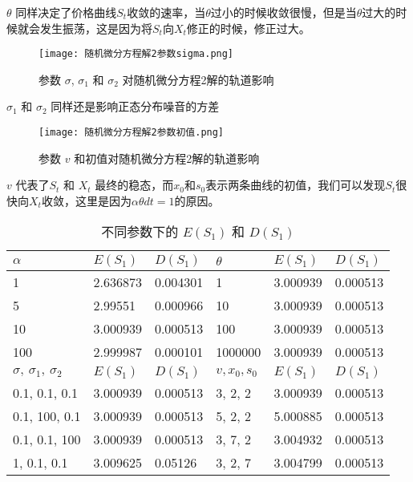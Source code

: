 \documentclass{article}
\begin{document}
$\theta$ 同样决定了价格曲线$S_t$收敛的速率，当$\theta$过小的时候收敛很慢，但是当$\theta$过大的时候就会发生振荡，这是因为将$S_t$向$X_t$修正的时候，修正过大。


\begin{figure}[H]
    \centering
    \texttt{[image: 随机微分方程解2参数sigma.png]}
    \caption{参数 $\sigma$, $\sigma_1$ 和 $\sigma_2$ 对随机微分方程2解的轨道影响}
    \label{fig:SDE2_sigma}
    \end{figure}    


$\sigma_1$ 和 $\sigma_2$ 同样还是影响正态分布噪音的方差


\begin{figure}[H]
    \centering
    \texttt{[image: 随机微分方程解2参数初值.png]}
    \caption{参数 $v$ 和初值对随机微分方程2解的轨道影响}
    \label{fig:SDE2_x0}
    \end{figure}

$v$ 代表了$S_t$ 和 $X_t$ 最终的稳态，而$x_0$和$s_0$表示两条曲线的初值，我们可以发现$S_t$很快向$X_t$收敛，这里是因为$\alpha\theta dt = 1$的原因。


\begin{table}[H]
    \centering
    \caption{不同参数下的 $E(S_1)$ 和 $D(S_1)$}
    \begin{tabular}{l|l|l|l|l|l}
    \hline
    $\alpha$                           & $E(S_1)$  & $D(S_1)$  & $\theta$               & $E(S_1)$  & $D(S_1)$  \\ \hline
    1                               & 2.636873 & 0.004301 & 1                   & 3.000939 & 0.000513 \\ 
    5                               & 2.99551  & 0.000966 & 10                  & 3.000939 & 0.000513 \\ 
    10                              & 3.000939 & 0.000513 & 100                 & 3.000939 & 0.000513 \\ 
    100                             & 2.999987 & 0.000101 & 1000000                 & 3.000939 & 0.000513 \\ \hline
    $\sigma,\ \sigma_1,\ \sigma_2$ & $E(S_1)$  & $D(S_1)$  & $v, x_0, s_0$ & $E(S_1)$  & $D(S_1)$  \\ \hline
    0.1, 0.1, 0.1                   & 3.000939 & 0.000513 & 3, 2, 2       & 3.000939 & 0.000513 \\ 
    0.1, 100, 0.1                 & 3.000939 & 0.000513 & 5, 2, 2       & 5.000885 & 0.000513 \\ 
    0.1, 0.1, 100                  & 3.000939 & 0.000513 & 3, 7, 2       & 3.004932 & 0.000513 \\ 
    1, 0.1, 0.1                  & 3.009625 & 0.05126  & 3, 2, 7       & 3.004799 & 0.000513 \\ \hline
    \end{tabular}
    \end{table}
\end{document}
